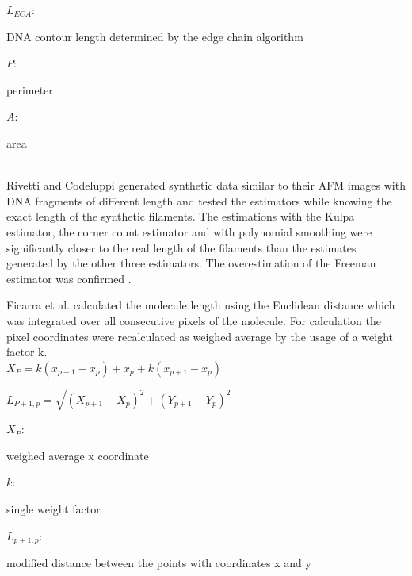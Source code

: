 \documentclass{article}
\begin{document}
$ L_{ECA} $: \begin{footnotesize}
DNA contour length determined by the edge chain algorithm 
\end{footnotesize} 

$ P $:\begin{footnotesize}
perimeter
\end{footnotesize} 

$ A $:\begin{footnotesize}
area
\end{footnotesize} \\

Rivetti and Codeluppi generated synthetic data similar to their AFM images with DNA fragments of different length and tested the estimators while knowing the exact length of the synthetic filaments. The estimations with the Kulpa estimator, the corner count estimator and with polynomial smoothing were significantly closer to the real length of the filaments than the estimates generated by the other three estimators. The overestimation of the Freeman estimator was confirmed \cite{rivetti2001accurate}.



Ficarra et al. calculated the molecule length using the Euclidean distance which was integrated over all consecutive pixels of the molecule. For calculation the pixel coordinates were recalculated as weighed average by the usage of a weight factor k.\\


$ X_{P} = k(x_{p-1}-x_{p})+x_{p}+k(x_{p+1}-x_{p}) $

$ L_{P+1,p}= \sqrt{(X_{p+1}-X_{p})^{2}+(Y_{p+1}-Y_{p})^{2}} $

\hspace{0,2cm}

$ X_{P} $:\begin{footnotesize}
weighed average x coordinate
\end{footnotesize}

$ k $:\begin{footnotesize} 
single weight factor
\end{footnotesize}

$ L_{p+1,p} $:\begin{footnotesize} 
modified distance between the points with coordinates x and y
\end{footnotesize}\\
\end{document}
